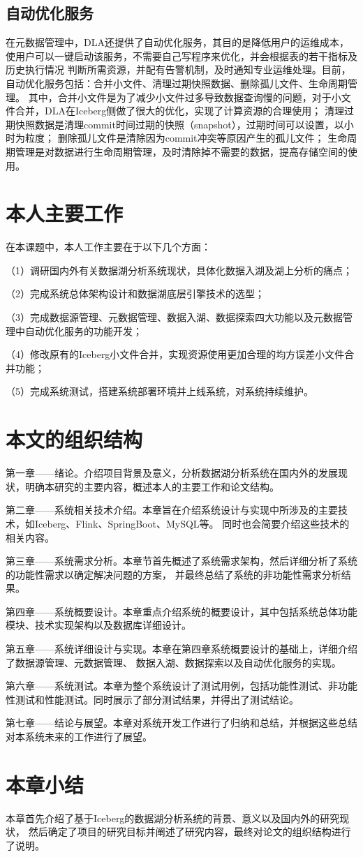 \subsection{自动优化服务}

在元数据管理中，DLA还提供了自动优化服务，其目的是降低用户的运维成本，使用户可以一键启动该服务，不需要自己写程序来优化，并会根据表的若干指标及历史执行情况
判断所需资源，并配有告警机制，及时通知专业运维处理。目前，自动优化服务包括：合并小文件、清理过期快照数据、删除孤儿文件、生命周期管理。
其中，合并小文件是为了减少小文件过多导致数据查询慢的问题，对于小文件合并，DLA在Iceberg侧做了很大的优化，实现了计算资源的合理使用；
清理过期快照数据是清理commit时间过期的快照（snapshot），过期时间可以设置，以小时为粒度；
删除孤儿文件是清除因为commit冲突等原因产生的孤儿文件；
生命周期管理是对数据进行生命周期管理，及时清除掉不需要的数据，提高存储空间的使用。

\section{本人主要工作}

在本课题中，本人工作主要在于以下几个方面：

（1）调研国内外有关数据湖分析系统现状，具体化数据入湖及湖上分析的痛点；

（2）完成系统总体架构设计和数据湖底层引擎技术的选型；

（3）完成数据源管理、元数据管理、数据入湖、数据探索四大功能以及元数据管理中自动优化服务的功能开发；

（4）修改原有的Iceberg小文件合并，实现资源使用更加合理的均方误差小文件合并功能；

（5）完成系统测试，搭建系统部署环境并上线系统，对系统持续维护。

\section{本文的组织结构}

第一章——绪论。介绍项目背景及意义，分析数据湖分析系统在国内外的发展现状，明确本研究的主要内容，概述本人的主要工作和论文结构。

第二章——系统相关技术介绍。本章旨在介绍系统设计与实现中所涉及的主要技术，如Iceberg、Flink、SpringBoot、MySQL等。
同时也会简要介绍这些技术的相关内容。

第三章——系统需求分析。本章节首先概述了系统需求架构，然后详细分析了系统的功能性需求以确定解决问题的方案，
并最终总结了系统的非功能性需求分析结果。

第四章——系统概要设计。本章重点介绍系统的概要设计，其中包括系统总体功能模块、技术实现架构以及数据库详细设计。

第五章——系统详细设计与实现。本章在第四章系统概要设计的基础上，详细介绍了数据源管理、元数据管理、
数据入湖、数据探索以及自动优化服务的实现。

第六章——系统测试。本章为整个系统设计了测试用例，包括功能性测试、非功能性测试和性能测试。同时展示了部分测试结果，并得出了测试结论。

第七章——结论与展望。本章对系统开发工作进行了归纳和总结，并根据这些总结对本系统未来的工作进行了展望。

\section{本章小结}

本章首先介绍了基于Iceberg的数据湖分析系统的背景、意义以及国内外的研究现状，
然后确定了项目的研究目标并阐述了研究内容，最终对论文的组织结构进行了说明。
